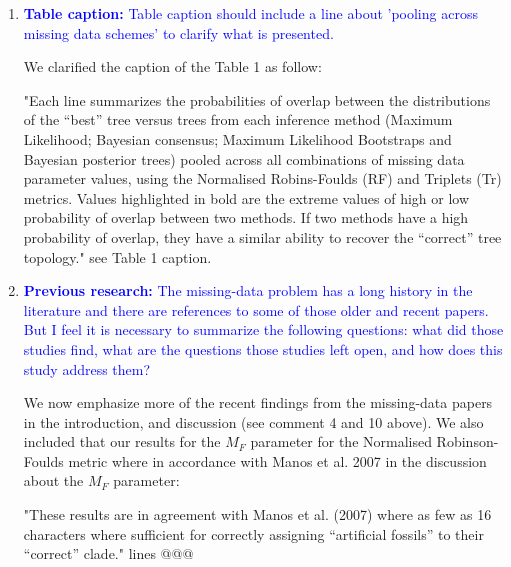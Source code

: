 \documentclass[12pt,letterpaper]{article}
\begin{document}
\begin{enumerate}
\item{\textcolor{blue}{\textbf{Table caption:} Table caption should include a line about 'pooling across missing data schemes' to clarify what is presented.}}

We clarified the caption of the Table 1 as follow:

"Each line summarizes the probabilities of overlap between the distributions of the ``best'' tree versus trees from each inference method (Maximum Likelihood; Bayesian consensus; Maximum Likelihood Bootstraps and Bayesian posterior trees) pooled across all combinations of missing data parameter values, using the Normalised Robins-Foulds (RF) and Triplets (Tr) metrics. 
Values highlighted in bold are the extreme values of high or low probability of overlap between two methods. If two methods have a high probability of overlap, they have a similar ability to recover the ``correct'' tree topology." see Table 1 caption.


\item{\textcolor{blue}{\textbf{Previous research:} The missing-data problem has a long history in the literature and there are references to some of those older and recent papers.
But I feel it is necessary to summarize the following questions: what did those studies find, what are the questions those studies left open, and how does this study address them?}}

We now emphasize more of the recent findings from the missing-data papers in the introduction, and discussion (see comment 4 and 10 above).
We also included that our results for the $M_F$ parameter for the Normalised Robinson-Foulds metric where in accordance with Manos et al. 2007 in the discussion about the $M_F$ parameter:

"These results are in agreement with Manos et al. (2007) where as few as 16 characters where sufficient for correctly assigning ``artificial fossils'' to their ``correct'' clade." lines @@@


\end{enumerate}
\end{document}
